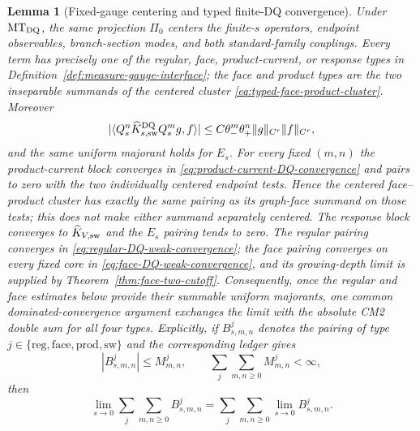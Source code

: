 \documentclass[11pt]{article}
\newtheorem{lemma}[theorem]{Lemma}
\begin{document}
\begin{lemma}[Fixed-gauge centering and typed finite-DQ convergence]
\label{lem:fixed-gauge-centering}
Under $\mathrm{MT}_{\rm DQ}$, the same projection $\Pi_0$ centers the
finite-$s$ operators, endpoint observables, branch-section modes, and both
standard-family couplings.  Every term has precisely one of the regular,
face, product-current, or response types in
Definition~\ref{def:measure-gauge-interface}; the face and product types are
the two inseparable summands of the centered cluster
\eqref{eq:typed-face-product-cluster}.  Moreover
\begin{equation}
\label{eq:derived-strong-weak-CM2}
 |\langle Q_s^n\widehat K_{s,\rm sw}^{\rm DQ}Q_s^mg,f\rangle|
 \le C\theta_-^m\theta_+^n\|g\|_{C^r}\|f\|_{C^r},
\end{equation}
and the same uniform majorant holds for $E_s$.  For every fixed $(m,n)$ the
product-current block converges in
\eqref{eq:product-current-DQ-convergence} and pairs to zero with the two
individually centered endpoint tests.  Hence the centered face--product
cluster has exactly the same pairing as its graph-face summand on those
tests; this does not make either summand separately centered.  The response block converges to
$\widehat K_{V,\rm sw}$ and the $E_s$ pairing
tends to zero.  The regular pairing converges in
\eqref{eq:regular-DQ-weak-convergence}; the face pairing converges on every
fixed core in \eqref{eq:face-DQ-weak-convergence}, and its growing-depth
limit is supplied by Theorem~\ref{thm:face-two-cutoff}.  Consequently, once the
regular and face estimates below provide their summable uniform majorants,
one common dominated-convergence argument exchanges the limit with the
absolute CM2 double sum for all four types.  Explicitly, if
$B_{s,m,n}^{j}$ denotes the pairing of type
$j\in\{\mathrm{reg},\mathrm{face},\mathrm{prod},\mathrm{sw}\}$ and the corresponding
ledger gives
\begin{equation}
\label{eq:typed-common-dominated-convergence}
 |B_{s,m,n}^{j}|\le M_{m,n}^{j},\qquad
 \sum_{j}\sum_{m,n\ge0}M_{m,n}^{j}<\infty,
\end{equation}
then
\[
 \lim_{s\to0}\sum_j\sum_{m,n\ge0}B_{s,m,n}^{j}
 =\sum_j\sum_{m,n\ge0}\lim_{s\to0}B_{s,m,n}^{j}.
\]
\end{lemma}
\end{document}
